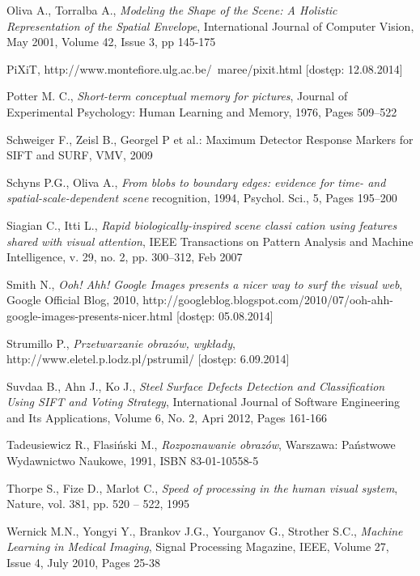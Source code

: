 \begin{thebibliography}{100}
 Oliva A., Torralba A., \emph{Modeling the Shape of the Scene: A Holistic Representation of the Spatial Envelope}, International Journal of Computer Vision, May 2001, Volume 42, Issue 3, pp 145-175

 PiXiT, http://www.montefiore.ulg.ac.be/~maree/pixit.html [dostęp: 12.08.2014]

 Potter M. C., \emph{Short-term conceptual memory for pictures}, Journal of Experimental Psychology: Human Learning and Memory, 1976, Pages 509–522

 Schweiger F., Zeisl B., Georgel P et al.: Maximum Detector Response Markers for SIFT and SURF, VMV, 
2009

 Schyns P.G., Oliva A., \emph{From blobs to boundary edges: evidence for time- and spatial-scale-dependent scene} recognition, 1994, Psychol. Sci., 5, Pages 195–200

 Siagian C., Itti L., \emph{Rapid biologically-inspired scene classi cation using features shared with visual attention}, IEEE Transactions on Pattern Analysis and Machine Intelligence, v. 29, no. 2, pp. 300–312, Feb 2007

 Smith N., \emph{Ooh! Ahh! Google Images presents a nicer way to surf the visual web}, Google Official Blog, 2010, http://googleblog.blogspot.com/2010/07/ooh-ahh-google-images-presents-nicer.html [dostęp: 05.08.2014]

 Strumillo P., \emph{Przetwarzanie obrazów, wykłady}, http://www.eletel.p.lodz.pl/pstrumil/ [dostęp: 6.09.2014]

 Suvdaa B., Ahn J., Ko J., \emph{Steel Surface Defects Detection and Classification Using SIFT and Voting Strategy}, International Journal of Software Engineering and Its Applications, Volume 6, No. 2, Apri 2012, Pages 161-166

 Tadeusiewicz R., Flasiński M., \emph{Rozpoznawanie obrazów}, Warszawa: Państwowe Wydawnictwo Naukowe, 1991, ISBN 83-01-10558-5

 Thorpe S., Fize D., Marlot C., \emph{Speed of processing in the human visual system}, Nature, vol. 381, pp. 520 – 522, 1995

 Wernick M.N., Yongyi Y., Brankov J.G., Yourganov G., Strother S.C., \emph{Machine Learning in Medical Imaging}, Signal Processing Magazine, IEEE, Volume 27,  Issue 4, July 2010, Pages 25-38


\end{thebibliography}

